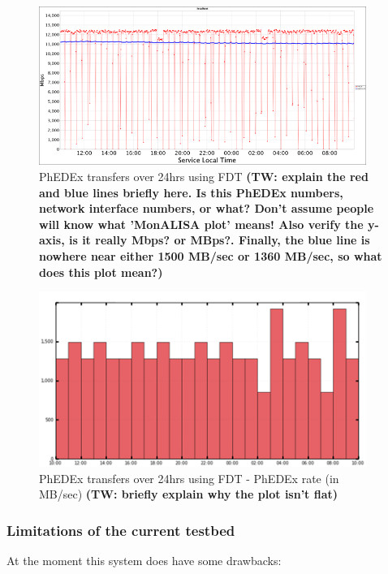\begin{figure}[h]
  \centering
  \includegraphics[width=0.95\textwidth]{Figures/FDT-transfers.png}
  \caption{PhEDEx transfers over 24hrs using FDT
\textbf{(TW: explain the red and blue lines briefly here. Is this PhEDEx numbers, network interface numbers, or what? Don't assume people will know what 'MonALISA plot' means! Also verify the y-axis, is it really Mbps? or MBps?. Finally, the blue line is nowhere near either 1500 MB/sec or 1360 MB/sec, so what does this plot mean?)}
  }
  \label{fig:FDT-Transfers}
\end{figure} 

\begin{figure}[h]
  \centering
  \includegraphics[width=0.95\textwidth]{Figures/FDT-transfers-PhEDEx.png}
  \caption{PhEDEx transfers over 24hrs using FDT - PhEDEx rate (in MB/sec)
\textbf{(TW: briefly explain why the plot isn't flat)}
  }
  \label{fig:FDT-Transfers-PhEDEx}
\end{figure} 


\subsubsection{Limitations of the current testbed}

At the moment this system does have some drawbacks:

